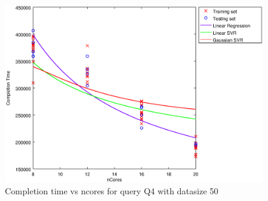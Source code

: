 
\begin {figure}[hbtp]
\centering
\includegraphics[width=\textwidth]{output/Q4_50_ALL_WITH_1_OVER_NCORES/plot_Q4_50_bestmodels.eps}
\caption{Completion time vs ncores for query Q4 with datasize 50}
\label{fig:all_linear_Q4_50}
\end {figure}
